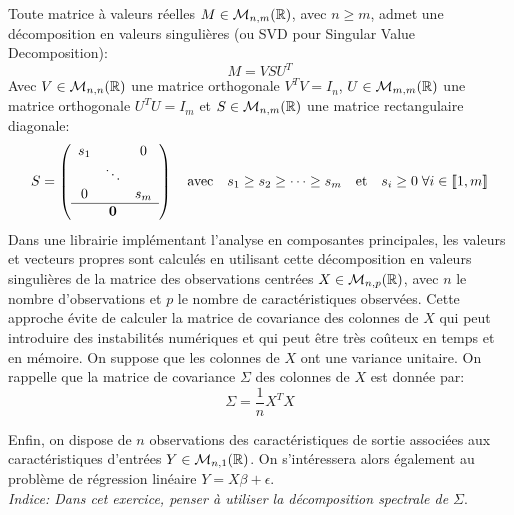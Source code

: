 \documentclass[solutions]{../exercices}
\begin{document}
	\begin{exercice}
		Toute matrice à valeurs réelles $M \in \mathcal{M}_{n,m}(\mathbb{R})$, avec $n \ge m$, admet une décomposition en valeurs singulières (ou SVD pour Singular Value Decomposition):
		\begin{equation*}
			M = V S U^T
		\end{equation*}
		Avec $V \in \mathcal{M}_{n,n}(\mathbb{R})$ une matrice orthogonale $V^T V = I_n$, $U \in \mathcal{M}_{m,m}(\mathbb{R})$ une matrice orthogonale $U^T U = I_m$ et $S \in \mathcal{M}_{n,m}(\mathbb{R})$ une matrice rectangulaire diagonale:
		\begin{equation*}
			S = 
			\left(
			\begin{array}{ccc}
				s_1 &        & 0 \\
				& \ddots &   \\
				0        &        & s_m \\
				\hline
				& \mathbf{0} & 
			\end{array}
			\right)	\quad \text{avec} \quad s_1 \ge s_2 \ge \cdots \ge s_m \quad \text{et} \quad s_i \ge 0 \; \forall i \in \llbracket1, m\rrbracket
		\end{equation*}		
		Dans une librairie implémentant l'analyse en composantes principales, les valeurs et vecteurs propres sont calculés en utilisant cette décomposition en valeurs singulières de la matrice des observations centrées $X \in \mathcal{M}_{n,p}(\mathbb{R})$, avec $n$ le nombre d'observations et $p$ le nombre de caractéristiques observées. Cette approche évite de calculer la matrice de covariance des colonnes de $X$ qui peut introduire des instabilités numériques et qui peut être très coûteux en temps et en mémoire. On suppose que les colonnes de $X$ ont une variance unitaire.
		On rappelle que la matrice de covariance $\Sigma$ des colonnes de $X$ est donnée par:
		\begin{equation*}
			\Sigma = \frac{1}{n} X^T X
		\end{equation*}
		
		Enfin, on dispose de $n$ observations des caractéristiques de sortie associées aux caractéristiques d'entrées $Y \in \mathcal{M}_{n,1}(\mathbb{R})$. On s'intéressera alors également au problème de régression linéaire $Y = X \beta + \epsilon$. \\
		
		\noindent \textit{Indice: Dans cet exercice, penser à utiliser la décomposition spectrale de $\Sigma$}.
		

\end{exercice}
\end{document}

